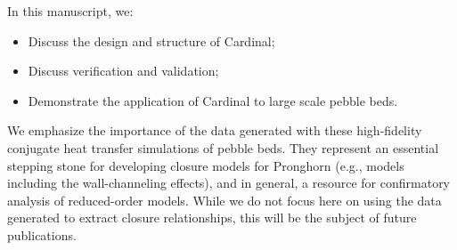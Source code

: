 In this manuscript, we:
\begin{itemize}
\item Discuss the design and structure of Cardinal;
\item Discuss verification and validation;
\item Demonstrate the application of Cardinal to large scale pebble beds.
\end{itemize}

We emphasize the importance of the data generated with these high-fidelity conjugate heat transfer simulations of pebble beds. They represent an essential stepping stone for developing closure models for Pronghorn (e.g., models including the wall-channeling effects), and in general, a resource for confirmatory analysis of reduced-order models. While we do not focus here on using the data generated to extract closure relationships, this will be the subject of future publications.
